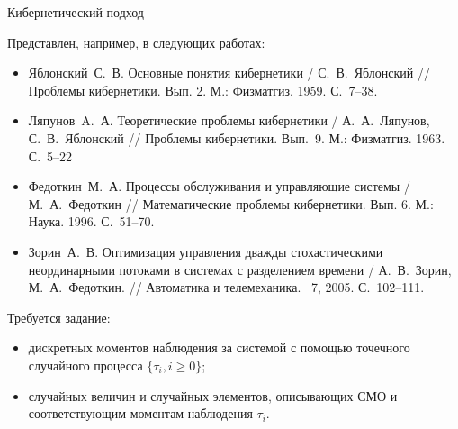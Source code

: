 \documentclass[10pt]{beamer}
\begin{document}
\begin{frame}[allowframebreaks]{Кибернетический подход}
\begin{block}{}
Представлен, например, в следующих работах:
\begin{itemize}
\item Яблонский~С.~В. Основные понятия кибернетики / С.~В.~Яблонский // Проблемы кибернетики. Вып. 2. М.: Физматгиз. 1959. С.~7--38.
  \item Ляпунов~A.~А. Теоретические проблемы кибернетики / А.~А.~Ляпунов, С.~В.~Яблонский // Проблемы кибернетики. Вып.~9. М.: Физматгиз. 1963. С.~5--22
\item Федоткин~М.~А. Процессы обслуживания и управляющие системы / М.~А.~Федоткин //  Математические проблемы кибернетики. Вып. 6. М.: Наука. 1996. С.~51--70.
\item Зорин~А.~В. Оптимизация управления дважды стохастическими неординарными потоками в системах с разделением времени / А.~В.~Зорин, М.~А.~Федоткин. // Автоматика и телемеханика. \No~7, 2005. С.~102--111.
\end{itemize}
\end{block}

  \framebreak

Требуется задание:
\begin{itemize}
\item дискретных моментов наблюдения за системой с помощью точечного случайного процесса $\{\tau_i, i\geqslant0\}$;
\item случайных величин и случайных элементов, описывающих СМО и соответствующим моментам наблюдения $\tau_i$.
\end{itemize}


\end{frame}
\end{document}
